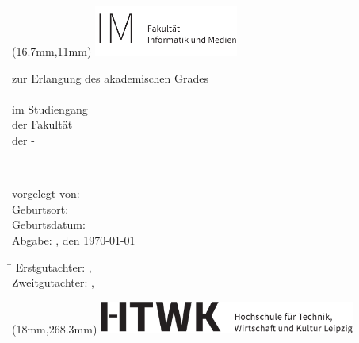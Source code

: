 

\begin{titlepage}
	\noindent
\begin{textblock*}{4.74cm}(16.7mm,11mm)
\includegraphics[width=4.74cm]{anlagen/bilder/logos/HTWK-Fakultaetszusatz_IM_schwarz_de-eps-converted-to.pdf}
\end{textblock*}
\begin{center}

\vspace*{0.5cm}

\large
{\textsc{\Large \abschlussarbeit}}

\vspace*{0.5cm}
zur Erlangung des akademischen Grades\\[0.6cm]
\studienganggrad\\[0.6cm]
im Studiengang \studiengang\\
der Fakultät \fakultaet\\
der \hochschule - \ort

{\LARGE \textbf{\titel}}\\
{\LARGE \textbf{\subtitel}}

\end{center}


\vspace*{2cm}
vorgelegt von: \autor \\
Geburtsort: \geburtsort \\
Geburtsdatum: \geburtstag \\
Abgabe: \ort, den \today


\vspace*{1cm}
\large
\begin{tabbing}
\hspace{4cm}\=\kill
Erstgutachter:  \> \erstgutachter, \instituteErstgutachter\\ 
Zweitgutachter: \> \zweitgutachter, \instituteZweitgutachter
\end{tabbing} 

\begin{textblock*}{8.41cm}(18mm,268.3mm)
\includegraphics[width=8.41cm]{anlagen/bilder/logos/htwk-logo-eps-converted-to.pdf}
\end{textblock*}

\end{titlepage}
